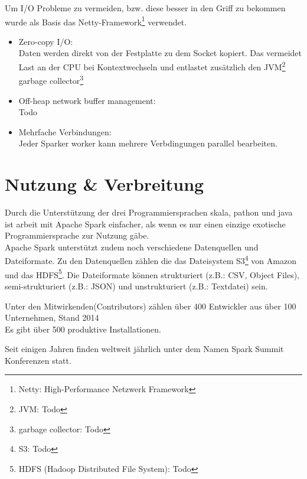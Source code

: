 Um I/O Probleme zu vermeiden, bzw. diese besser in den Griff zu bekommen wurde als Basis das Netty-Framework\footnote{Netty: High-Performance Netzwerk Framework} verwendet.
\begin{itemize}
	\item Zero-copy I/O:\\
	Daten werden direkt von der Festplatte zu dem Socket kopiert. Das vermeidet Last an der CPU bei Kontextwechseln und entlastet zusätzlich den JVM\footnote{JVM: Todo} garbage collector\footnote{garbage collector: Todo}
	\item Off-heap network buffer management:\\
	Todo
	\item Mehrfache Verbindungen:\\
	Jeder Sparker worker kann mehrere Verbdingungen parallel bearbeiten.
\end{itemize}


\newpage
\section{Nutzung \& Verbreitung}

Durch die Unterstützung der drei Programmiersprachen skala, pathon und java ist arbeit mit Apache Spark einfacher, als wenn es nur einen einzige exotische Programmiersprache zur Nutzung gäbe. \\
Apache Spark unterstützt zudem noch verschiedene Datenquellen und Dateiformate.  Zu den Datenquellen zählen die das Dateisystem S3\footnote{S3: Todo} von Amazon und das HDFS\footnote{HDFS (Hadoop Distributed File System): Todo}.
Die Dateiformate können strukturiert (z.B.: CSV, Object Files), semi-strukturiert (z.B.: JSON) und unstrukturiert (z.B.: Textdatei) sein.


Unter den Mitwirkenden(Contributors) zählen über 400 Entwickler aus über 100 Unternehmen, Stand 2014 \\
Es gibt über 500 produktive Installationen. %

Seit einigen Jahren finden weltweit jährlich unter dem Namen Spark Summit Konferenzen statt. \cite{SPCOM}\\



